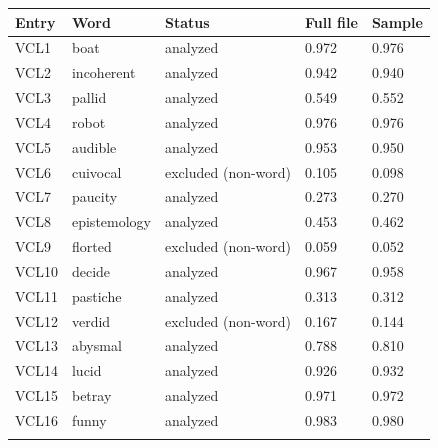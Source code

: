 \begin{longtable}{lllll}
\toprule
Entry & Word & Status & Full file & Sample \\
\midrule\endhead
VCL1 & boat & analyzed & 0.972 & 0.976 \\ \addlinespace[3pt]
VCL2 & incoherent & analyzed & 0.942 & 0.940 \\ \addlinespace[3pt]
VCL3 & pallid & analyzed & 0.549 & 0.552 \\ \addlinespace[3pt]
VCL4 & robot & analyzed & 0.976 & 0.976 \\ \addlinespace[3pt]
VCL5 & audible & analyzed & 0.953 & 0.950 \\ \addlinespace[3pt]
VCL6 & cuivocal & excluded (non-word) & 0.105 & 0.098 \\ \addlinespace[3pt]
VCL7 & paucity & analyzed & 0.273 & 0.270 \\ \addlinespace[3pt]
VCL8 & epistemology & analyzed & 0.453 & 0.462 \\ \addlinespace[3pt]
VCL9 & florted & excluded (non-word) & 0.059 & 0.052 \\ \addlinespace[3pt]
VCL10 & decide & analyzed & 0.967 & 0.958 \\ \addlinespace[3pt]
VCL11 & pastiche & analyzed & 0.313 & 0.312 \\ \addlinespace[3pt]
VCL12 & verdid & excluded (non-word) & 0.167 & 0.144 \\ \addlinespace[3pt]
VCL13 & abysmal & analyzed & 0.788 & 0.810 \\ \addlinespace[3pt]
VCL14 & lucid & analyzed & 0.926 & 0.932 \\ \addlinespace[3pt]
VCL15 & betray & analyzed & 0.971 & 0.972 \\ \addlinespace[3pt]
VCL16 & funny & analyzed & 0.983 & 0.980 \\ \addlinespace[3pt]
\bottomrule\end{longtable}
